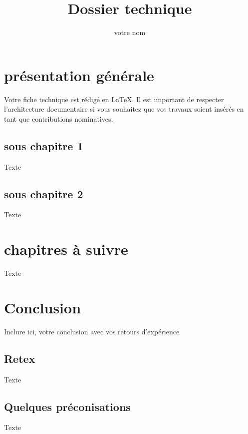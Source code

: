 \documentclass[11pt,fleqn,twoside]{article}
\author{votre nom}
\title{Dossier technique}
\begin{document}
\maketitle
\uelogo

\section{présentation générale}
Votre fiche technique est rédigé en \LaTeX. Il est important de respecter l'architecture documentaire si vous souhaitez que vos travaux soient insérés en tant que contributions nominatives.
\subsection{sous chapitre 1}
Texte
\subsection{sous chapitre 2}
Texte
\section{chapitres à suivre }
Texte 
\section{Conclusion}
Inclure ici, votre conclusion avec vos retours d'expérience
\subsection{Retex}
Texte
\subsection{Quelques préconisations}
Texte
\end{document}
